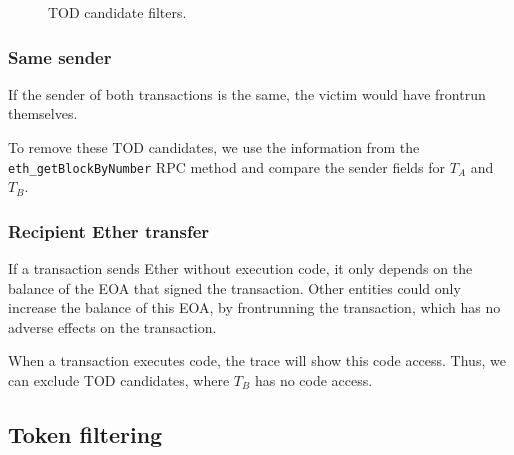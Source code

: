 \documentclass[draft,final]{vutinfth} %
\begin{document}
\begin{figure}[h]
    \centering
    \caption{TOD candidate filters.}
    \label{fig:tod_candidate_dependency}
\end{figure}

\subsubsection{Same sender}

If the sender of both transactions is the same, the victim would have frontrun themselves.

To remove these TOD candidates, we use the information from the \verb|eth_getBlockByNumber| RPC method and compare the sender fields for $T_A$ and $T_B$.

\subsubsection{Recipient Ether transfer}

If a transaction sends Ether without execution code, it only depends on the balance of the EOA that signed the transaction. Other entities could only increase the balance of this EOA, by frontrunning the transaction, which has no adverse effects on the transaction.

When a transaction executes code, the trace will show this code access. Thus, we can exclude TOD candidates, where $T_B$ has no code access.

\subsection{Token filtering}

\end{document}
